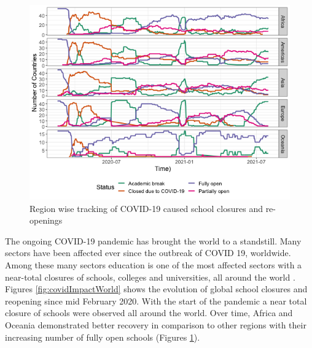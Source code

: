 \documentclass[11pt,a4paper,]{article}
\begin{document}
\begin{figure}[h]

{\centering \includegraphics[width=1\textwidth]{figure/covidImpactContinent-1} 

}

\caption{Region wise tracking of COVID-19 caused school closures and re-openings}\label{fig:covidImpactContinent}
\end{figure}

The ongoing COVID-19 pandemic has brought the world to a standstill. Many sectors have been affected ever since the outbreak of COVID 19, worldwide. Among these many sectors education is one of the most affected sectors with a near-total closures of schools, colleges and universities, all around the world \autocite{daniel2020education}. Figures \ref{fig:covidImpactWorld} shows the evolution of global school closures and reopening since mid February 2020. With the start of the pandemic a near total closure of schools were observed all around the world. Over time, Africa and Oceania demonstrated better recovery in comparison to other regions with their increasing number of fully open schools (Figures \ref{fig:covidImpactContinent}).
\end{document}
